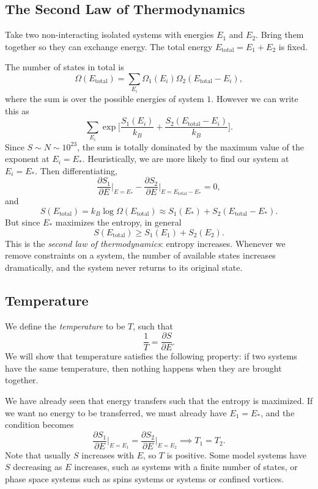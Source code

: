 \documentclass[12pt]{article}
\begin{document}
\subsection{The Second Law of Thermodynamics}
\label{sub:2nd_law}

Take two non-interacting isolated systems with energies $E_1$ and $E_2$. Bring them together so they can exchange energy. The total energy $E_{\mathrm{total}} = E_1 + E_2$ is fixed.

The number of states in total is
\[
\Omega(E_{\mathrm{total}}) = \sum_{E_i} \Omega_1(E_i) \Omega_2(E_{\mathrm{total}}-E_i),
\]
where the sum is over the possible energies of system $1$. However we can write this as
\[
	\sum_{E_i} \exp \biggl[ \frac{S_1(E_i)}{k_B} + \frac{S_2(E_{\mathrm{total}} - E_i)}{k_B} \biggr].
\]
Since $S \sim N \sim 10^{23}$, the sum is totally dominated by the maximum value of the exponent at $E_i = E_\ast$. Heuristically, we are more likely to find our system at $E_i = E_\ast$. Then differentiating,
\[
\frac{\partial S_1}{\partial E} \biggr|_{E = E_\ast} - \frac{\partial S_2}{\partial E} \biggr|_{E = E_{\mathrm{total}} - E_\ast} = 0,
\]
and
\[
S(E_{\mathrm{total}}) = k_B \log \Omega(E_{\mathrm{total}}) \approx S_1(E_\ast) + S_2(E_{\mathrm{total}} - E_\ast).
\]
But since $E_\ast$ maximizes the entropy, in general
\[
S(E_{\mathrm{total}}) \geq S_1 (E_1) + S_2(E_2).
\]
This is the \emph{second law of thermodynamics}: entropy increases. Whenever we remove constraints on a system, the number of available states increases dramatically, and the system never returns to its original state.


\subsection{Temperature}
\label{sub:temp}

We define the \emph{temperature} to be $T$, such that
\[
\frac{1}{T} = \frac{\partial S}{\partial E}.
\]
We will show that temperature satisfies the following property: if two systems have the same temperature, then nothing happens when they are brought together.

We have already seen that energy transfers such that the entropy is maximized. If we want no energy to be transferred, we must already have $E_1 = E_\ast$, and the condition becomes
\[
\frac{\partial S_1}{\partial E} \biggr|_{E = E_1} = \frac{\partial S_2}{\partial E} \biggr|_{E = E_2} \implies T_1 = T_2.
\]
Note that usually $S$ increases with $E$, so $T$ is positive. Some model systems have $S$ decreasing as $E$ increases, such as systems with a finite number of states, or phase space systems such as spins systems or systems or confined vortices.
\end{document}
